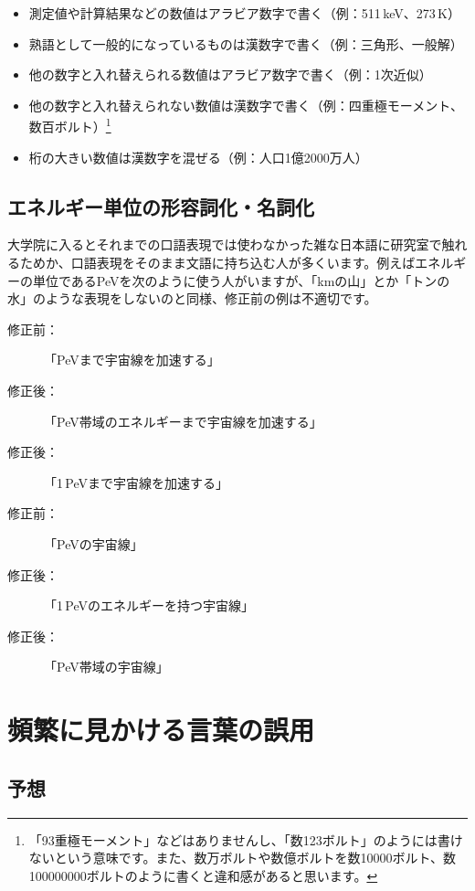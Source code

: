\begin{itemize}
\item 測定値や計算結果などの数値はアラビア数字で書く（例：511\,keV、273\,K）
\item 熟語として一般的になっているものは漢数字で書く（例：三角形、一般解）
\item 他の数字と入れ替えられる数値はアラビア数字で書く（例：1次近似）
\item 他の数字と入れ替えられない数値は漢数字で書く（例：四重極モーメント、数百ボルト）\footnote{「93重極モーメント」などはありませんし、「数123ボルト」のようには書けないという意味です。また、数万ボルトや数億ボルトを数10000ボルト、数100000000ボルトのように書くと違和感があると思います。}
\item 桁の大きい数値は漢数字を混ぜる（例：人口1億2000万人）
\end{itemize}

\subsection{エネルギー単位の形容詞化・名詞化}

大学院に入るとそれまでの口語表現では使わなかった雑な日本語に研究室で触れるためか、口語表現をそのまま文語に持ち込む人が多くいます。例えばエネルギーの単位であるPeVを次のように使う人がいますが、「kmの山」とか「トンの水」のような表現をしないのと同様、修正前の例は不適切です。

\begin{description}
\item[修正前：]「PeVまで宇宙線を加速する」
\item[修正後：]「PeV帯域のエネルギーまで宇宙線を加速する」
\item[修正後：]「1\,PeVまで宇宙線を加速する」
\end{description}

\begin{description}
\item[修正前：]「PeVの宇宙線」
\item[修正後：]「1\,PeVのエネルギーを持つ宇宙線」
\item[修正後：]「PeV帯域の宇宙線」
\end{description}

\section{頻繁に見かける言葉の誤用}

\subsection{予想}

